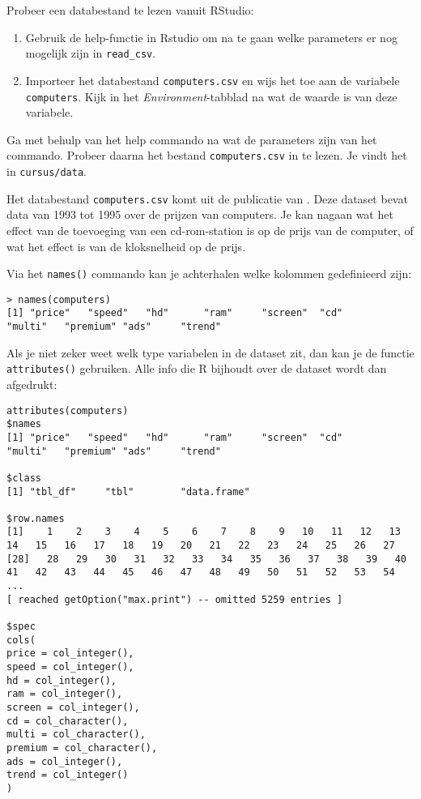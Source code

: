 \begin{exercise}
  Probeer een databestand te lezen vanuit RStudio:

  \begin{enumerate}
    \item Gebruik de help-functie in Rstudio om na te gaan welke parameters er nog mogelijk zijn in \texttt{read\_csv}.
    \item Importeer het databestand \texttt{computers.csv} en wijs het toe aan de variabele \texttt{computers}. Kijk in het \textit{Environment}-tabblad na wat de waarde is van deze variabele.
  \end{enumerate}

  Ga met behulp van het help commando na wat de parameters zijn van het commando. Probeer daarna het bestand \texttt{computers.csv} in te lezen. Je vindt het in \texttt{cursus/data}.
\end{exercise}

Het databestand \texttt{computers.csv} komt uit de publicatie van \textcite{Stengos2005}. Deze dataset bevat data van 1993 tot 1995 over de prijzen van computers. Je kan nagaan wat het effect van de toevoeging van een cd-rom-station is op de prijs van de computer, of wat het effect is van de kloksnelheid op de prijs.

Via het \texttt{names()} commando kan je achterhalen welke kolommen gedefinieerd zijn:

\begin{lstlisting}[breaklines=true]
> names(computers)
[1] "price"   "speed"   "hd"      "ram"     "screen"  "cd"      "multi"   "premium" "ads"     "trend"
\end{lstlisting}

Als je niet zeker weet welk type variabelen in de dataset zit, dan kan je de functie \texttt{attributes()} gebruiken. Alle info die R bijhoudt over de dataset wordt dan afgedrukt:

\begin{lstlisting}[breaklines=true]
attributes(computers)
$names
[1] "price"   "speed"   "hd"      "ram"     "screen"  "cd"      "multi"   "premium" "ads"     "trend"

$class
[1] "tbl_df"     "tbl"        "data.frame"

$row.names
[1]    1    2    3    4    5    6    7    8    9   10   11   12   13   14   15   16   17   18   19   20   21   22   23   24   25   26   27
[28]   28   29   30   31   32   33   34   35   36   37   38   39   40   41   42   43   44   45   46   47   48   49   50   51   52   53   54
...
[ reached getOption("max.print") -- omitted 5259 entries ]

$spec
cols(
price = col_integer(),
speed = col_integer(),
hd = col_integer(),
ram = col_integer(),
screen = col_integer(),
cd = col_character(),
multi = col_character(),
premium = col_character(),
ads = col_integer(),
trend = col_integer()
)

\end{lstlisting}

